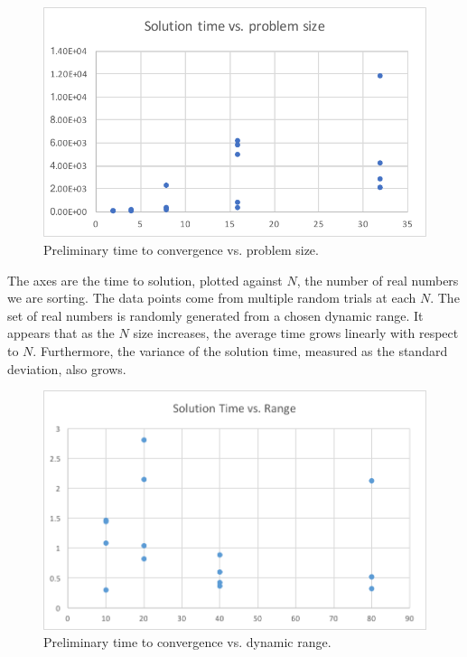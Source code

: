 \begin{figure}[h]
\centering
\includegraphics[width=\columnwidth]{graphics/ode_time_vs_problem_size.pdf}
\caption{Preliminary time to convergence vs. problem size.}
\end{figure}

The axes are the time to solution, plotted against $N$, the number of real numbers we are sorting.
The data points come from multiple random trials at each $N$.
The set of real numbers is randomly generated from a chosen dynamic range.
It appears that as the $N$ size increases, the average time grows linearly with respect to $N$.
Furthermore, the variance of the solution time, measured as the standard deviation, also grows.

\begin{figure}[h]
\centering
\includegraphics[width=\columnwidth]{graphics/range_vs_solution.png}
\caption{Preliminary time to convergence vs. dynamic range.}
\end{figure}

